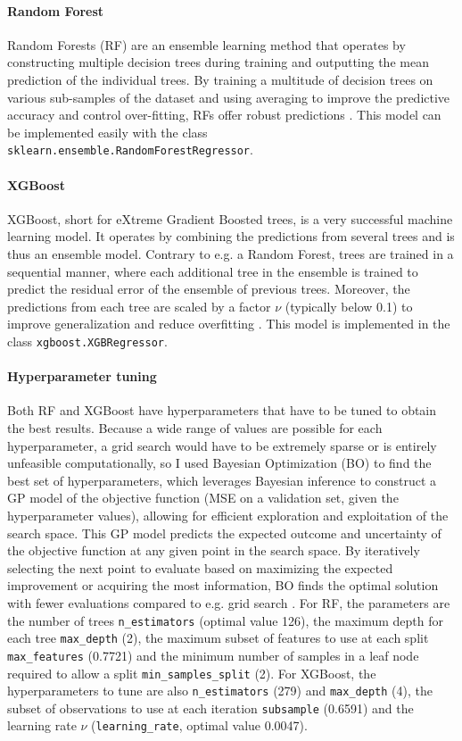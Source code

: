 \documentclass{article}
\begin{document}
\paragraph{Random Forest}
Random Forests (RF) are an ensemble learning method that operates by constructing multiple decision trees during training and outputting the mean prediction of the individual trees. By training a multitude of decision trees on various sub-samples of the dataset and using averaging to improve the predictive accuracy and control over-fitting, RFs offer robust predictions \citep{rfs}. This model can be implemented easily with the class \texttt{sklearn.ensemble.RandomForestRegressor}.

\paragraph{XGBoost} XGBoost, short for eXtreme Gradient Boosted trees, is a very successful machine learning model. It operates by combining the predictions from several trees and is thus an ensemble model. Contrary to e.g. a Random Forest, trees are trained in a sequential manner, where each additional tree in the ensemble is trained to predict the residual error of the ensemble of previous trees. Moreover, the predictions from each tree are scaled by a factor $\nu$ (typically below 0.1) to improve generalization and reduce overfitting \citep{xgb}. This model is implemented in the class \texttt{xgboost.XGBRegressor}.

\paragraph{Hyperparameter tuning}
Both RF and XGBoost have hyperparameters that have to be tuned to obtain the best results. Because a wide range of values are possible for each hyperparameter, a grid search would have to be extremely sparse or is entirely unfeasible computationally, so I used Bayesian Optimization (BO) to find the best set of hyperparameters, which leverages Bayesian inference to construct a GP model of the objective function (MSE on a validation set, given the hyperparameter values), allowing for efficient exploration and exploitation of the search space. This GP model predicts the expected outcome and uncertainty of the objective function at any given point in the search space. By iteratively selecting the next point to evaluate based on maximizing the expected improvement or acquiring the most information, BO finds the optimal solution with fewer evaluations compared to e.g. grid search \citep{BO}. For RF, the parameters are the number of trees  \texttt{n\_estimators} (optimal value 126), the maximum depth for each tree \texttt{max\_depth} (2), the maximum subset of features to use at each split \texttt{max\_features} (0.7721) and the minimum number of samples in a leaf node required to allow a split \texttt{min\_samples\_split} (2). For XGBoost, the hyperparameters to tune are also \texttt{n\_estimators} (279) and \texttt{max\_depth} (4), the subset of observations to use at each iteration \texttt{subsample} (0.6591) and the learning rate $\nu$ (\texttt{learning\_rate}, optimal value 0.0047). 
\end{document}

